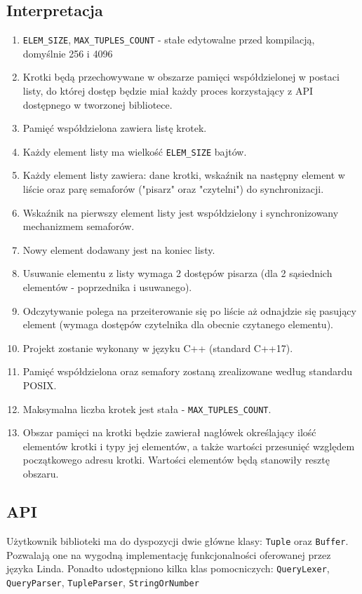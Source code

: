\documentclass[a4paper]{article}
\begin{document}
	\subsection{Interpretacja}
	\begin{enumerate}
		\item \texttt{ELEM\_SIZE}, \texttt{MAX\_TUPLES\_COUNT} - stałe edytowalne przed kompilacją, domyślnie 256 i 4096
		\item Krotki będą przechowywane w obszarze pamięci współdzielonej w postaci listy, do której dostęp będzie miał każdy proces korzystający z API dostępnego w tworzonej bibliotece.
		\item Pamięć współdzielona zawiera listę krotek.
		\item Każdy element listy ma wielkość \texttt{ELEM\_SIZE} bajtów.
		\item Każdy element listy zawiera: dane krotki, wskaźnik na następny element w liście oraz parę semaforów ("pisarz" oraz "czytelni") do synchronizacji.
		\item Wskaźnik na pierwszy element listy jest współdzielony i synchronizowany mechanizmem semaforów.
		\item Nowy element dodawany jest na koniec listy.
		\item Usuwanie elementu z listy wymaga 2 dostępów pisarza (dla 2 sąsiednich elementów - poprzednika i usuwanego).
		\item Odczytywanie polega na przeiterowanie się po liście aż odnajdzie się pasujący element (wymaga dostępów czytelnika dla obecnie czytanego elementu).
		\item Projekt zostanie wykonany w języku C++ (standard C++17).
		\item Pamięć współdzielona oraz semafory zostaną zrealizowane według standardu POSIX.
		\item Maksymalna liczba krotek jest stała - \texttt{MAX\_TUPLES\_COUNT}.
		\item Obszar pamięci na krotki będzie zawierał nagłówek określający ilość elementów krotki i typy jej elementów, a także wartości przesunięć względem początkowego adresu krotki. Wartości elementów będą stanowiły resztę obszaru.
	\end{enumerate}

	\subsection{API}
	Użytkownik biblioteki ma do dyspozycji dwie główne klasy: \texttt{Tuple} oraz \texttt{Buffer}. Pozwalają one na wygodną implementację funkcjonalności oferowanej przez języka Linda. Ponadto udostępniono kilka klas pomocniczych: \texttt{QueryLexer}, \texttt{QueryParser}, \texttt{TupleParser}, \texttt{StringOrNumber}
\end{document}
